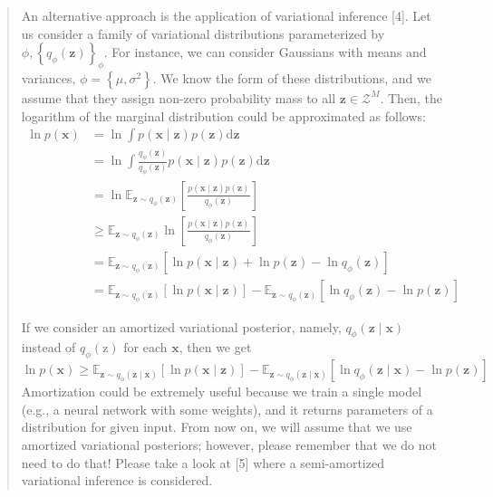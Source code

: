 \documentclass{article}
\begin{document}
\begin{appendix}
\blockquote{An alternative approach is the application of variational inference [4]. Let us consider a family of variational
distributions parameterized by $\phi,\left\{q_{\phi}(\mathbf{z})\right\}_{\phi}$. For instance, we can consider Gaussians with means and variances, $\phi=\left\{\mu, \sigma^{2}\right\}$. We know the form of these distributions, and we assume that they assign non-zero probability mass to all $\mathbf{z} \in \mathcal{Z}^{M}$. Then, the logarithm of the marginal distribution could be approximated as follows:
$$
\begin{aligned}
\ln p(\mathbf{x}) &=\ln \int p(\mathbf{x} \mid \mathbf{z}) p(\mathbf{z}) \mathrm{d} \mathbf{z} \\
&=\ln \int \frac{q_{\phi}(\mathbf{z})}{q_{\phi}(\mathbf{z})} p(\mathbf{x} \mid \mathbf{z}) p(\mathbf{z}) \mathrm{d} \mathbf{z} \\
&=\ln \mathbb{E}_{\mathbf{z} \sim q_{\phi}(\mathbf{z})}\left[\frac{p(\mathbf{x} \mid \mathbf{z}) p(\mathbf{z})}{q_{\phi}(\mathbf{z})}\right] \\
& \geq \mathbb{E}_{\mathbf{z} \sim q_{\phi}(\mathbf{z})} \ln \left[\frac{p(\mathbf{x} \mid \mathbf{z}) p(\mathbf{z})}{q_{\phi}(\mathbf{z})}\right] \\
&=\mathbb{E}_{\mathbf{z} \sim q_{\phi}(\mathbf{z})}\left[\ln p(\mathbf{x} \mid \mathbf{z})+\ln p(\mathbf{z})-\ln q_{\phi}(\mathbf{z})\right] \\
&=\mathbb{E}_{\mathbf{z} \sim q_{\phi}(\mathbf{z})}[\ln p(\mathbf{x} \mid \mathbf{z})]-\mathbb{E}_{\mathbf{z} \sim q_{\phi}(\mathbf{z})}\left[\ln q_{\phi}(\mathbf{z})-\ln p(\mathbf{z})\right]
\end{aligned}
$$

If we consider an amortized variational posterior, namely, $q_{\phi}(\mathbf{z} \mid \mathbf{x})$ instead of $q_{\phi}(\mathrm{z})$ for each $\mathbf{x}$, then we get
$$
\ln p(\mathbf{x}) \geq \mathbb{E}_{\mathbf{z} \sim q_{\phi}(\mathbf{z} \mid \mathbf{x})}[\ln p(\mathbf{x} \mid \mathbf{z})]-\mathbb{E}_{\mathbf{z} \sim q_{\phi}(\mathbf{z} \mid \mathbf{x})}\left[\ln q_{\phi}(\mathbf{z} \mid \mathbf{x})-\ln p(\mathbf{z})\right]
$$
Amortization could be extremely useful because we train a single model (e.g., a neural network with some weights), and it returns parameters of a distribution for given input. From now on, we will assume that we use amortized variational posteriors; however, please remember that we do not need to do that! Please take a look at [5] where a semi-amortized variational inference is considered.

}
\end{appendix}
\end{document}
